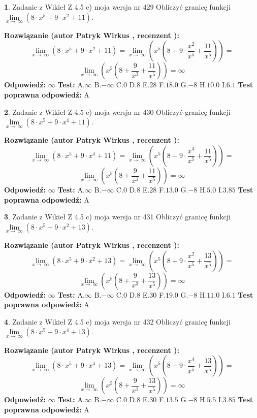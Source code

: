 \documentclass[12pt, a4paper]{article}
\theoremstyle{definition} %
\newtheorem{zad}{}
\newcommand{\zadStart}[1]{\begin{zad}#1\newline}
\newcommand{\zadStop}{\end{zad}}
\newcommand{\rozwStart}[2]{\noindent \textbf{Rozwiązanie (autor #1 , recenzent #2): }\newline}
\newcommand{\rozwStop}{\newline}
\newcommand{\odpStart}{\noindent \textbf{Odpowiedź:}\newline}
\newcommand{\odpStop}{\newline}
\newcommand{\testStart}{\noindent \textbf{Test:}\newline}
\newcommand{\testStop}{\newline}
\newcommand{\kluczStart}{\noindent \textbf{Test poprawna odpowiedź:}\newline}
\newcommand{\kluczStop}{\newline}
\begin{document}
\zadStart{Zadanie z Wikieł Z 4.5 c) moja wersja nr 429}
Obliczyć granicę funkcji  $\lim\limits_{x\to\ \infty}(8 \cdot x^{5}+9 \cdot x^{2}+11)$.
\zadStop
\rozwStart{Patryk Wirkus}{}
$$\lim\limits_{x\to\ \infty}(8 \cdot x^{5}+9 \cdot x^{2}+11) = \lim\limits_{x\to\ \infty}(x^{5}(8 +9 \cdot \frac{x^{2}}{x^{5}}+\frac{11}{x^{5}})) =$$ $$\lim\limits_{x\to\ \infty}(x^{5}(8 +\frac{9}{x^{3}}+\frac{11}{x^{5}})) =\infty$$
\rozwStop
\odpStart
$\infty$
\odpStop
\testStart
A.$\infty$ B.$-\infty$ C.$0$ D.$8$ E.$28$
F.$18.0$ G.$-8$
H.$10.0$
I.$6.1$
\testStop
\kluczStart
A
\kluczStop



\zadStart{Zadanie z Wikieł Z 4.5 c) moja wersja nr 430}
Obliczyć granicę funkcji  $\lim\limits_{x\to\ \infty}(8 \cdot x^{5}+9 \cdot x^{4}+11)$.
\zadStop
\rozwStart{Patryk Wirkus}{}
$$\lim\limits_{x\to\ \infty}(8 \cdot x^{5}+9 \cdot x^{4}+11) = \lim\limits_{x\to\ \infty}(x^{5}(8 +9 \cdot \frac{x^{4}}{x^{5}}+\frac{11}{x^{5}})) =$$ $$\lim\limits_{x\to\ \infty}(x^{5}(8 +\frac{9}{x^{1}}+\frac{11}{x^{5}})) =\infty$$
\rozwStop
\odpStart
$\infty$
\odpStop
\testStart
A.$\infty$ B.$-\infty$ C.$0$ D.$8$ E.$28$
F.$13.0$ G.$-8$
H.$5.0$
I.$3.85$
\testStop
\kluczStart
A
\kluczStop



\zadStart{Zadanie z Wikieł Z 4.5 c) moja wersja nr 431}
Obliczyć granicę funkcji  $\lim\limits_{x\to\ \infty}(8 \cdot x^{5}+9 \cdot x^{2}+13)$.
\zadStop
\rozwStart{Patryk Wirkus}{}
$$\lim\limits_{x\to\ \infty}(8 \cdot x^{5}+9 \cdot x^{2}+13) = \lim\limits_{x\to\ \infty}(x^{5}(8 +9 \cdot \frac{x^{2}}{x^{5}}+\frac{13}{x^{5}})) =$$ $$\lim\limits_{x\to\ \infty}(x^{5}(8 +\frac{9}{x^{3}}+\frac{13}{x^{5}})) =\infty$$
\rozwStop
\odpStart
$\infty$
\odpStop
\testStart
A.$\infty$ B.$-\infty$ C.$0$ D.$8$ E.$30$
F.$19.0$ G.$-8$
H.$11.0$
I.$6.1$
\testStop
\kluczStart
A
\kluczStop



\zadStart{Zadanie z Wikieł Z 4.5 c) moja wersja nr 432}
Obliczyć granicę funkcji  $\lim\limits_{x\to\ \infty}(8 \cdot x^{5}+9 \cdot x^{4}+13)$.
\zadStop
\rozwStart{Patryk Wirkus}{}
$$\lim\limits_{x\to\ \infty}(8 \cdot x^{5}+9 \cdot x^{4}+13) = \lim\limits_{x\to\ \infty}(x^{5}(8 +9 \cdot \frac{x^{4}}{x^{5}}+\frac{13}{x^{5}})) =$$ $$\lim\limits_{x\to\ \infty}(x^{5}(8 +\frac{9}{x^{1}}+\frac{13}{x^{5}})) =\infty$$
\rozwStop
\odpStart
$\infty$
\odpStop
\testStart
A.$\infty$ B.$-\infty$ C.$0$ D.$8$ E.$30$
F.$13.5$ G.$-8$
H.$5.5$
I.$3.85$
\testStop
\kluczStart
A
\kluczStop
\end{document}
